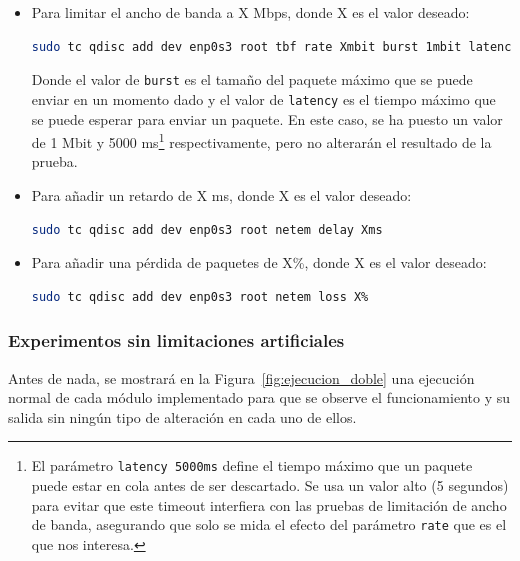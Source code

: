 \begin{itemize}
    \item Para limitar el ancho de banda a X Mbps, donde X es el valor deseado:
    \begin{lstlisting}[language=bash, breaklines=true]
    sudo tc qdisc add dev enp0s3 root tbf rate Xmbit burst 1mbit latency 5000ms
\end{lstlisting}
    Donde el valor de \texttt{burst} es el tamaño del paquete máximo que se puede enviar en un momento dado y el valor de \texttt{latency} es el tiempo máximo que se puede esperar para enviar un paquete. En este caso, se ha puesto un valor de 1 Mbit y 5000 ms\footnote{El parámetro \texttt{latency 5000ms} define el tiempo máximo que un paquete puede estar en cola antes de ser descartado. Se usa un valor alto (5 segundos) para evitar que este timeout interfiera con las pruebas de limitación de ancho de banda, asegurando que solo se mida el efecto del parámetro \texttt{rate} que es el que nos interesa.} respectivamente, pero no alterarán el resultado de la prueba.
    \item Para añadir un retardo de X ms, donde X es el valor deseado:
    \begin{lstlisting}[language=bash]
    sudo tc qdisc add dev enp0s3 root netem delay Xms
\end{lstlisting}
    \item Para añadir una pérdida de paquetes de X\%, donde X es el valor deseado:
    \begin{lstlisting}[language=bash]
    sudo tc qdisc add dev enp0s3 root netem loss X%
\end{lstlisting}
\end{itemize}


\newpage

\subsubsection{Experimentos sin limitaciones artificiales}

Antes de nada, se mostrará en la Figura~\ref{fig:ejecucion_doble} una ejecución normal de cada módulo implementado para que se observe el funcionamiento y su salida sin ningún tipo de alteración en cada uno de ellos. 
\vspace{\baselineskip}

